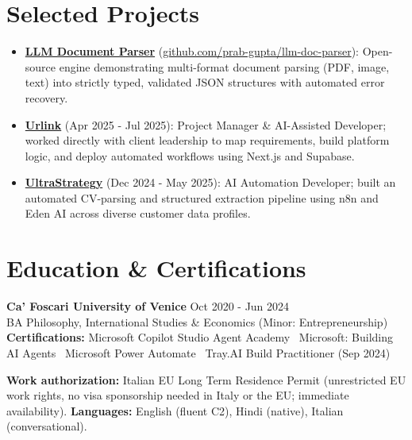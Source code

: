 \documentclass[a4paper,10pt]{article}
\begin{document}
\section{Selected Projects}
\begin{itemize}
  \item \textbf{\href{https://github.com/prab-gupta/llm-doc-parser}{LLM Document Parser}} (\href{https://github.com/prab-gupta/llm-doc-parser}{github.com/prab-gupta/llm-doc-parser}): Open-source engine demonstrating multi-format document parsing (PDF, image, text) into strictly typed, validated JSON structures with automated error recovery.
  \item \textbf{\href{https://smarturlink.com/}{Urlink}} (Apr 2025 - Jul 2025): Project Manager \& AI-Assisted Developer; worked directly with client leadership to map requirements, build platform logic, and deploy automated workflows using Next.js and Supabase.
  \item \textbf{\href{https://ultrastrategy.com}{UltraStrategy}} (Dec 2024 - May 2025): AI Automation Developer; built an automated CV-parsing and structured extraction pipeline using n8n and Eden AI across diverse customer data profiles.
\end{itemize}

\section{Education \& Certifications}
\textbf{Ca' Foscari University of Venice} \hfill Oct 2020 - Jun 2024\\
BA Philosophy, International Studies \& Economics (Minor: Entrepreneurship)\\[1pt]
\textbf{Certifications:} Microsoft Copilot Studio Agent Academy \textbullet\ Microsoft: Building AI Agents \textbullet\ Microsoft Power Automate \textbullet\ Tray.AI Build Practitioner (Sep 2024)

\vspace{2pt}
{\small \textbf{Work authorization:} Italian EU Long Term Residence Permit (unrestricted EU work rights, no visa sponsorship needed in Italy or the EU; immediate availability). \quad \textbf{Languages:} English (fluent C2), Hindi (native), Italian (conversational).}
\end{document}
